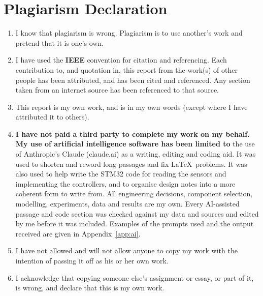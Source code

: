 \chapter{Plagiarism Declaration}
\label{ch:decl}

\begin{enumerate}[label=\arabic*., leftmargin=*, itemsep=6pt]
    \item I know that plagiarism is wrong. Plagiarism is to use another's work and pretend that it is one's own.

    \item I have used the \textbf{IEEE} convention for citation and referencing. Each contribution to, and quotation in, this report from the work(s) of other people has been attributed, and has been cited and referenced. Any section taken from an internet source has been referenced to that source.

    \item This report is my own work, and is in my own words (except where I have attributed it to others).

\item \textbf{I have not paid a third party to complete my work on my behalf. My use of artificial intelligence software has been limited to} the use of Anthropic's Claude (claude.ai) as a writing, editing and coding aid. It was used to shorten and reword long passages and fix \LaTeX\ problems. It was also used to help write the STM32 code for reading the sensors and implementing the controllers, and to organise design notes into a more coherent form to write from. All engineering decisions, component selection, modelling, experiments, data and results are my own. Every AI-assisted passage and code section was checked against my data and sources and edited by me before it was included. Examples of the prompts used and the output received are given in Appendix~\ref{app:ai}.

    \item I have not allowed and will not allow anyone to copy my work with the intention of passing it off as his or her own work.

    \item I acknowledge that copying someone else's assignment or essay, or part of it, is wrong, and declare that this is my own work.
\end{enumerate}

